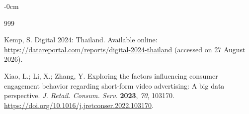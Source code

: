 \documentclass[jtaer,article,submit,moreauthors]{Definitions/mdpi}
\begin{document}
\begin{adjustwidth}{-\extralength}{0cm}



% 


\begin{thebibliography}{999}
	
	Kemp, S.
	Digital 2024: Thailand.
	Available online:
	\url{https://datareportal.com/reports/digital-2024-thailand}
	(accessed on 27 August 2026).
	
	Xiao, L.; Li, X.; Zhang, Y.
	Exploring the factors influencing consumer engagement behavior
	regarding short-form video advertising: A big data perspective.
	{\em J. Retail. Consum. Serv.} {\bf 2023}, {\em 70}, 103170.
	\url{https://doi.org/10.1016/j.jretconser.2022.103170}.
	

\end{thebibliography}
\end{adjustwidth}
\end{document}
